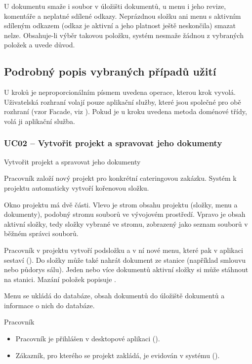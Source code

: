 \begin{description}[itemsep=1pt]
U dokumentu smaže i soubor v úložišti dokumentů, u menu i jeho revize, komentáře a neplatné sdílené odkazy. Neprázdnou složku ani menu s aktivním sdíleným odkazem (odkaz je aktivní a jeho platnost ještě neskončila) smazat nelze. Obsahuje-li výběr takovou položku, systém nesmaže žádnou z vybraných položek a uvede důvod.
\end{description}

\subsection{Podrobný popis vybraných případů užití}

U kroků je neproporcionálním písmem uvedena operace, kterou krok vyvolá. Uživatelská rozhraní volají pouze aplikační služby, které jsou společné pro obě rozhraní (vzor Facade, viz ). Pokud je u kroku uvedena metoda doménové třídy, volá ji aplikační služba.

\subsubsection{UC02 -- Vytvořit projekt a spravovat jeho dokumenty}\label{ucd:02}

Vytvořit projekt a spravovat jeho dokumenty

Pracovník založí nový projekt pro konkrétní cateringovou zakázku. Systém k projektu automaticky vytvoří kořenovou složku.

Okno projektu má dvě části. Vlevo je strom obsahu projektu (složky, menu a dokumenty), podobný stromu souborů ve vývojovém prostředí. Vpravo je obsah aktivní složky, tedy složky vybrané ve stromu, zobrazený jako seznam souborů v běžném správci souborů.

Pracovník v projektu vytvoří podsložku a v ní nové menu, které pak v aplikaci sestaví (). Do složky může také nahrát dokument ze stanice (například smlouvu nebo půdorys sálu). Jeden nebo více dokumentů aktivní složky si může stáhnout na stanici. Mazání položek popisuje .

Menu se ukládá do databáze, obsah dokumentů do úložiště dokumentů a informace o nich do databáze.

Pracovník

\begin{itemize}[itemsep=0pt]
  \item Pracovník je přihlášen v desktopové aplikaci ().
  \item Zákazník, pro kterého se projekt zakládá, je evidován v systému ().
\end{itemize}

